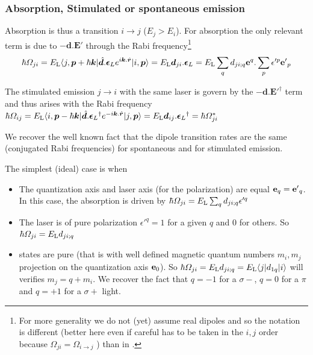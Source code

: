 \documentclass[amsmath,amssymb,nofootinbib]{revtex4-2}
\begin{document}
	 		 	
	 		 	 
	 		 	 
	 		 	
	 		 	 
	 		 	 
	 		 	 \subsubsection{Absorption, Stimulated or spontaneous emission}
	 		 	 

	 	 
	Absorption is thus a  transition $i \rightarrow j$ ($E_j> E_i$). For absorption
	 the only relevant term is due to $-\bm d.\bm E'$ through the Rabi frequency\footnote{	For more generality we do not (yet) assume real dipoles and so the notation is different (better here even if careful has to be taken in the $i,j$ order because $\Omega_{ji} =\Omega_{i \rightarrow j} $ ) than in \cite{comparat2014molecular}.}
\begin{equation}
\hbar  \Omega_{ji} = E_{\rm L} \langle j, \bm p + \hbar \bm k |   \hat{\bm d} . \bm \epsilon_L
	e^{ i \bm k.\hat{\bm r}} | i, \bm p\rangle =  E_{\rm L}   \bm d_{ji} . \bm \epsilon_L = E_{\rm L} 
 \sum_q  d_{ji;q} {\bf{e}}^q .	\sum_{p} \epsilon'^p 	{\bf e'}_{p} 
 \label{Rabi_frequancy}
 \end{equation}
	



	 	 
	 	The stimulated emission  $j \rightarrow i$  with the same laser is govern by the $-\bm d.{\bm E'}^\dag$ term and thus arises with the Rabi frequency
$\hbar  \Omega_{ij}  = E_{\rm L} \langle i, \bm p - \hbar \bm k |   \hat{\bm d} . {\bm \epsilon_L}^\dag
	 	 e^{  - i \bm k.\hat{\bm r}} | j, \bm p\rangle = E_{\rm L} \bm d_{ij} . {\bm \epsilon_L }^\dag =\hbar  \Omega_{ji}^*$
	 	 
	 	 We recover the well known fact that the dipole transition rates are the same (conjugated Rabi frequencies) for spontaneous and for stimulated emission.
	 	 
	 	 
	 	 	 The simplest (ideal) case is when
	 	 \begin{itemize}
	 	 	\item The  quantization axis and laser axis (for the polarization) are equal ${\bf{e}}_q={\bf{e'}}_q$.  In this case,  	  the absorption is driven by $\hbar  \Omega_{ji} = E_{\rm L} \sum_q  d_{ji;q}  \epsilon'^q $
	 	 	\item The laser is of pure polarization $ \epsilon'^q =1$ for a given $q$ and $0$ for others. So $\hbar  \Omega_{ji} = E_{\rm L}  d_{ji;q} $
	 	 	\item  states are pure (that is with well defined magnetic quantum numbers $m_i,m_j$ projection on the quantization axis ${\bf{e}}_0$). So $\hbar  \Omega_{ji} = E_{\rm L}  d_{ji;q}  =  E_{\rm L}   \langle j |   d_{1q} | i \rangle $ will verifies $m_j = q+ m_i  $.  We recover the fact that
	 	 	$ q=-1$ for a $\sigma-$, 	 $ q=0$ for a $ \pi$ and
	 	 	$ q= +1$ for a $\sigma+$ light. 
	 	 \end{itemize}
	 	
\end{document}
